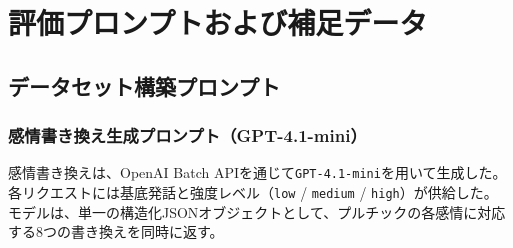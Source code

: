 \appendix
\chapter{評価プロンプトおよび補足データ}

\section{データセット構築プロンプト}
\label{app:dataset_prompts}

\subsection{感情書き換え生成プロンプト（GPT-4.1-mini）}
\label{app:rewrite_prompt}

感情書き換えは、OpenAI Batch APIを通じて\texttt{GPT-4.1-mini}を用いて生成した。
各リクエストには基底発話と強度レベル（\texttt{low} / \texttt{medium} / \texttt{high}）が供給した。
モデルは、単一の構造化JSONオブジェクトとして、プルチックの各感情に対応する8つの書き換えを同時に返す。

